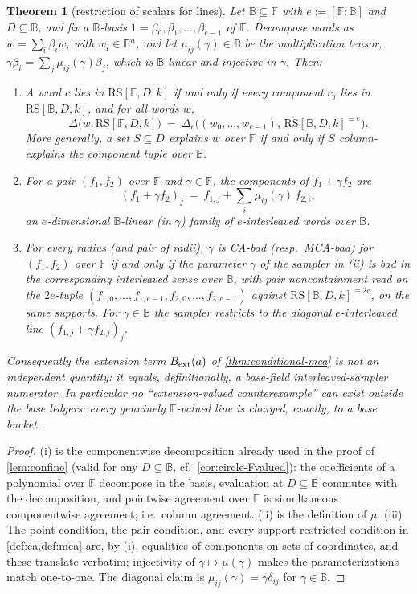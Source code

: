 \documentclass[11pt]{article}
\newtheorem{theorem}{Theorem}[section]
\theoremstyle{definition}
\theoremstyle{remark}
\newcommand{\F}{\mathbb{F}}
\newcommand{\B}{\mathbb{B}}
\newcommand{\RS}{\mathrm{RS}}
\newcommand{\dist}{\Delta}
\begin{document}
\begin{theorem}[restriction of scalars for lines]\label{thm:weil-lines}
Let $\B\subseteq\F$ with $e:=[\F:\B]$ and $D\subseteq\B$, and fix a $\B$-basis $1=\beta_0,\beta_1,\dots,\beta_{e-1}$ of $\F$. Decompose words as $w=\sum_i\beta_iw_i$ with $w_i\in\B^n$, and let $\mu_{ij}(\gamma)\in\B$ be the multiplication tensor, $\gamma\beta_i=\sum_j\mu_{ij}(\gamma)\beta_j$, which is $\B$-linear and injective in $\gamma$. Then:
\begin{enumerate}[label=\textup{(\roman*)}]
\item A word $c$ lies in $\RS[\F,D,k]$ if and only if every component $c_j$ lies in $\RS[\B,D,k]$, and for all words $w$,
\[
\dist\bigl(w,\RS[\F,D,k]\bigr)\ =\ \dist_e\bigl((w_0,\dots,w_{e-1}),\,\RS[\B,D,k]^{\equiv e}\bigr).
\]
More generally, a set $S\subseteq D$ explains $w$ over $\F$ if and only if $S$ column-explains the component tuple over $\B$.
\item For a pair $(f_1,f_2)$ over $\F$ and $\gamma\in\F$, the components of $f_1+\gamma f_2$ are
\[
(f_1+\gamma f_2)_j\ =\ f_{1,j}+\sum_{i}\mu_{ij}(\gamma)\,f_{2,i},
\]
an $e$-dimensional $\B$-linear \textup(in $\gamma$\textup) family of $e$-interleaved words over $\B$.
\item For every radius \textup(and pair of radii\textup), $\gamma$ is CA-bad \textup(resp.\ MCA-bad\textup) for $(f_1,f_2)$ over $\F$ if and only if the parameter $\gamma$ of the sampler in \textup{(ii)} is bad in the corresponding interleaved sense over $\B$, with pair noncontainment read on the $2e$-tuple $(f_{1,0},\dots,f_{1,e-1},f_{2,0},\dots,f_{2,e-1})$ against $\RS[\B,D,k]^{\equiv2e}$, on the same supports. For $\gamma\in\B$ the sampler restricts to the diagonal $e$-interleaved line $(f_{1,j}+\gamma f_{2,j})_j$.
\end{enumerate}
Consequently the extension term $B_{\rm ext}(a)$ of \cref{thm:conditional-mca} is not an independent quantity: it equals, definitionally, a base-field interleaved-sampler numerator. In particular no ``extension-valued counterexample'' can exist outside the base ledgers: every genuinely $\F$-valued line is charged, exactly, to a base bucket.
\end{theorem}

\begin{proof}
(i) is the componentwise decomposition already used in the proof of \cref{lem:confine} \textup(valid for any $D\subseteq\B$, cf.\ \cref{cor:circle-Fvalued}\textup): the coefficients of a polynomial over $\F$ decompose in the basis, evaluation at $D\subseteq\B$ commutes with the decomposition, and pointwise agreement over $\F$ is simultaneous componentwise agreement, i.e.\ column agreement. (ii) is the definition of $\mu$. (iii) The point condition, the pair condition, and every support-restricted condition in \cref{def:ca,def:mca} are, by (i), equalities of components on sets of coordinates, and these translate verbatim; injectivity of $\gamma\mapsto\mu(\gamma)$ makes the parameterizations match one-to-one. The diagonal claim is $\mu_{ij}(\gamma)=\gamma\delta_{ij}$ for $\gamma\in\B$.
\end{proof}
\end{document}
